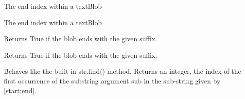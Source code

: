 \documentclass[letterpaper,10pt,english]{sphinxmanual}
\begin{document}
\begin{fulllineitems}

\begin{fulllineitems}
\label{api_reference:textblob_de.blob.Sentence.end}
The end index within a textBlob

\end{fulllineitems}


\begin{fulllineitems}
\label{api_reference:textblob_de.blob.Sentence.end_index}
The end index within a textBlob

\end{fulllineitems}


\begin{fulllineitems}
\label{api_reference:textblob_de.blob.Sentence.ends_with}
Returns True if the blob ends with the given suffix.

\end{fulllineitems}


\begin{fulllineitems}
\label{api_reference:textblob_de.blob.Sentence.endswith}
Returns True if the blob ends with the given suffix.

\end{fulllineitems}


\begin{fulllineitems}
\label{api_reference:textblob_de.blob.Sentence.find}
Behaves like the built-in str.find() method. Returns an integer,
the index of the first occurrence of the substring argument sub in the
sub-string given by {[}start:end{]}.

\end{fulllineitems}



\end{fulllineitems}
\end{document}
